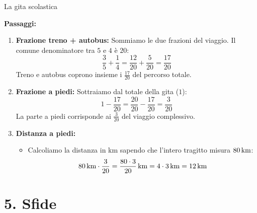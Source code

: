 \begin{esercizio}{La gita scolastica}
\begin{soluzione}
  \textbf{Passaggi:}
  \begin{enumerate}[label=\alph*)]
    \item \textbf{Frazione treno + autobus:} Sommiamo le due frazioni del viaggio. Il comune denominatore tra $5$ e $4$ è $20$:
      \[
      \frac{3}{5} + \frac{1}{4} = \frac{12}{20} + \frac{5}{20} = \frac{17}{20}
      \]
      Treno e autobus coprono insieme i $\frac{17}{20}$ del percorso totale.
    \item \textbf{Frazione a piedi:} Sottraiamo dal totale della gita ($1$):
      \[
      1 - \frac{17}{20} = \frac{20}{20} - \frac{17}{20} = \frac{3}{20}
      \]
      La parte a piedi corrisponde ai $\frac{3}{20}$ del viaggio complessivo.
    \item \textbf{Distanza a piedi:}
      \begin{itemize}
        \item Calcoliamo la distanza in km sapendo che l'intero tragitto misura $80\,\mathrm{km}$:
          \[
          80\,\mathrm{km} \cdot \frac{3}{20} = \frac{80 \cdot 3}{20}\,\mathrm{km} = 4 \cdot 3\,\mathrm{km} = 12\,\mathrm{km}
          \]
      \end{itemize}
  \end{enumerate}
\end{soluzione}
\end{esercizio}

\condnewpage


\section*{5. Sfide}

